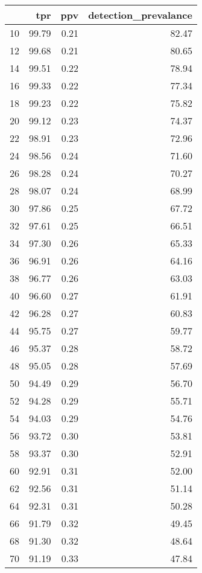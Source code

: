 \begin{table}[ht]
\centering
\begin{tabular}{rrrr}
  \hline
 & tpr & ppv & detection\_prevalance \\ 
  \hline
   10 & 99.79 & 0.21 & 82.47 \\ 
     12 & 99.68 & 0.21 & 80.65 \\ 
     14 & 99.51 & 0.22 & 78.94 \\ 
     16 & 99.33 & 0.22 & 77.34 \\ 
     18 & 99.23 & 0.22 & 75.82 \\ 
     20 & 99.12 & 0.23 & 74.37 \\ 
     22 & 98.91 & 0.23 & 72.96 \\ 
     24 & 98.56 & 0.24 & 71.60 \\ 
     26 & 98.28 & 0.24 & 70.27 \\ 
     28 & 98.07 & 0.24 & 68.99 \\ 
     30 & 97.86 & 0.25 & 67.72 \\ 
     32 & 97.61 & 0.25 & 66.51 \\ 
     34 & 97.30 & 0.26 & 65.33 \\ 
     36 & 96.91 & 0.26 & 64.16 \\ 
     38 & 96.77 & 0.26 & 63.03 \\ 
     40 & 96.60 & 0.27 & 61.91 \\ 
     42 & 96.28 & 0.27 & 60.83 \\ 
     44 & 95.75 & 0.27 & 59.77 \\ 
     46 & 95.37 & 0.28 & 58.72 \\ 
     48 & 95.05 & 0.28 & 57.69 \\ 
     50 & 94.49 & 0.29 & 56.70 \\ 
     52 & 94.28 & 0.29 & 55.71 \\ 
     54 & 94.03 & 0.29 & 54.76 \\ 
     56 & 93.72 & 0.30 & 53.81 \\ 
     58 & 93.37 & 0.30 & 52.91 \\ 
     60 & 92.91 & 0.31 & 52.00 \\ 
     62 & 92.56 & 0.31 & 51.14 \\ 
     64 & 92.31 & 0.31 & 50.28 \\ 
     66 & 91.79 & 0.32 & 49.45 \\ 
     68 & 91.30 & 0.32 & 48.64 \\ 
     70 & 91.19 & 0.33 & 47.84 \\ 

\end{tabular}
\end{table}

